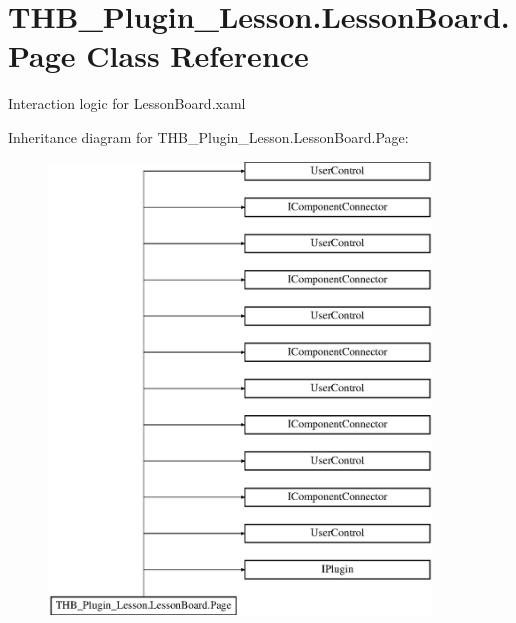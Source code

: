 \hypertarget{class_t_h_b___plugin___lesson_1_1_lesson_board_1_1_page}{}\section{T\+H\+B\+\_\+\+Plugin\+\_\+\+Lesson.\+Lesson\+Board.\+Page Class Reference}
\label{class_t_h_b___plugin___lesson_1_1_lesson_board_1_1_page}


Interaction logic for Lesson\+Board.\+xaml  


Inheritance diagram for T\+H\+B\+\_\+\+Plugin\+\_\+\+Lesson.\+Lesson\+Board.\+Page\+:\begin{figure}[H]
\begin{center}
\leavevmode
\includegraphics[height=12.000000cm]{d9/dce/class_t_h_b___plugin___lesson_1_1_lesson_board_1_1_page}
\end{center}
\end{figure}
